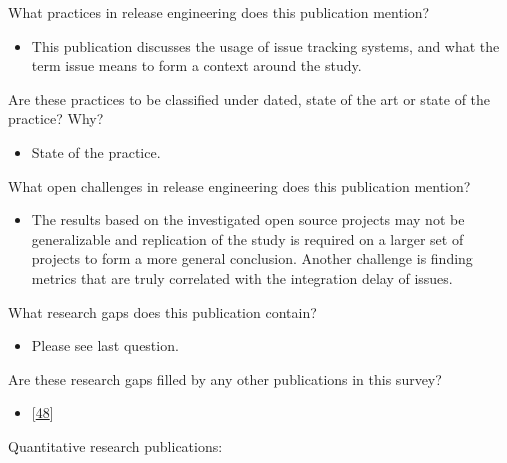 \documentclass[]{book}
\providecommand{\tightlist}{%
  \setlength{\itemsep}{0pt}\setlength{\parskip}{0pt}}
\begin{document}
What practices in release engineering does this publication mention?

\begin{itemize}
\tightlist
\item
  This publication discusses the usage of issue tracking systems, and
  what the term issue means to form a context around the study.
\end{itemize}

Are these practices to be classified under dated, state of the art or
state of the practice? Why?

\begin{itemize}
\tightlist
\item
  State of the practice.
\end{itemize}

What open challenges in release engineering does this publication
mention?

\begin{itemize}
\tightlist
\item
  The results based on the investigated open source projects may not be
  generalizable and replication of the study is required on a larger set
  of projects to form a more general conclusion. Another challenge is
  finding metrics that are truly correlated with the integration delay
  of issues.
\end{itemize}

What research gaps does this publication contain?

\begin{itemize}
\tightlist
\item
  Please see last question.
\end{itemize}

Are these research gaps filled by any other publications in this survey?

\begin{itemize}
\tightlist
\item
  {[}\protect\hyperlink{ref-da2016a}{48}{]}
\end{itemize}

Quantitative research publications:
\end{document}
